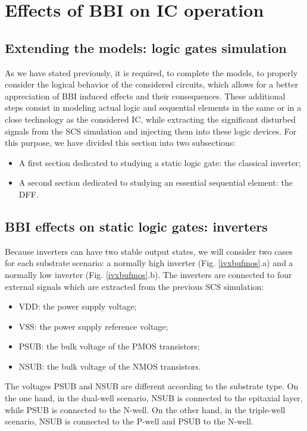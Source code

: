 
\section{Effects of BBI on IC operation}
\subsection{Extending the models: logic gates simulation}
	As we have stated previously, it is required, to complete the models, to properly consider the logical behavior of the considered circuits, which allows for a better appreciation of BBI induced effects and their consequences.
	These additional steps consist in modeling actual logic and sequential elements in the same or in a close technology as the considered IC, while extracting the significant disturbed signals from the SCS simulation and injecting them into these logic devices.
	For this purpose, we have divided this section into two subsections:
	\begin{itemize}
		\item A first section dedicated to studying a static logic gate: the classical inverter;
		\item A second section dedicated to studying an essential sequential element: the DFF.
	\end{itemize}

\subsection{BBI effects on static logic gates: inverters}
	
	Because inverters can have two stable output states, we will consider two cases for each substrate scenario: a normally high inverter (Fig. \ref{ivxbufmos}.a) and a normally low inverter (Fig. \ref{ivxbufmos}.b).
	The inverters are connected to four external signals which are extracted from the previous SCS simulation:
	\begin{itemize}
			\item VDD: the power supply voltage;
			\item VSS: the power supply reference voltage;
			\item PSUB: the bulk voltage of the PMOS transistors;
			\item NSUB: the bulk voltage of the NMOS transistors.
		\end{itemize}
	The voltages PSUB and NSUB are different according to the substrate type.
	On the one hand, in the dual-well scenario, NSUB is connected to the epitaxial layer, while PSUB is connected to the N-well.
	On the other hand, in the triple-well scenario, NSUB is connected to the P-well and PSUB to the N-well.

